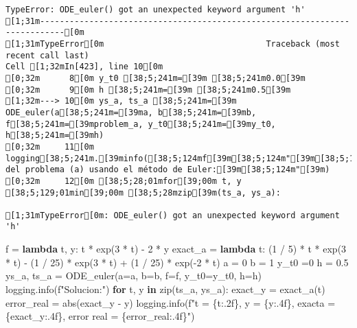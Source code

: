 \documentclass[
  letterpaper,
  DIV=11,
  numbers=noendperiod]{scrartcl}
\newenvironment{Shaded}{\begin{snugshade}}{\end{snugshade}}
\newcommand{\BuiltInTok}[1]{\textcolor[rgb]{0.00,0.23,0.31}{#1}}
\newcommand{\ControlFlowTok}[1]{\textcolor[rgb]{0.00,0.23,0.31}{\textbf{#1}}}
\newcommand{\DecValTok}[1]{\textcolor[rgb]{0.68,0.00,0.00}{#1}}
\newcommand{\FloatTok}[1]{\textcolor[rgb]{0.68,0.00,0.00}{#1}}
\newcommand{\KeywordTok}[1]{\textcolor[rgb]{0.00,0.23,0.31}{\textbf{#1}}}
\newcommand{\NormalTok}[1]{\textcolor[rgb]{0.00,0.23,0.31}{#1}}
\newcommand{\OperatorTok}[1]{\textcolor[rgb]{0.37,0.37,0.37}{#1}}
\newcommand{\SpecialCharTok}[1]{\textcolor[rgb]{0.37,0.37,0.37}{#1}}
\newcommand{\SpecialStringTok}[1]{\textcolor[rgb]{0.13,0.47,0.30}{#1}}
\begin{document}
\begin{verbatim}
TypeError: ODE_euler() got an unexpected keyword argument 'h'
[1;31m---------------------------------------------------------------------------[0m
[1;31mTypeError[0m                                 Traceback (most recent call last)
Cell [1;32mIn[423], line 10[0m
[0;32m      8[0m y_t0 [38;5;241m=[39m [38;5;241m0.0[39m
[0;32m      9[0m h [38;5;241m=[39m [38;5;241m0.5[39m
[1;32m---> 10[0m ys_a, ts_a [38;5;241m=[39m ODE_euler(a[38;5;241m=[39ma, b[38;5;241m=[39mb, f[38;5;241m=[39mproblem_a, y_t0[38;5;241m=[39my_t0, h[38;5;241m=[39mh)
[0;32m     11[0m logging[38;5;241m.[39minfo([38;5;124mf[39m[38;5;124m"[39m[38;5;124mResultados del problema (a) usando el método de Euler:[39m[38;5;124m"[39m)
[0;32m     12[0m [38;5;28;01mfor[39;00m t, y [38;5;129;01min[39;00m [38;5;28mzip[39m(ts_a, ys_a):

[1;31mTypeError[0m: ODE_euler() got an unexpected keyword argument 'h'
\end{verbatim}

\begin{Shaded}
\begin{Highlighting}[]
\NormalTok{f }\OperatorTok{=} \KeywordTok{lambda}\NormalTok{ t, y: t }\OperatorTok{*}\NormalTok{ exp(}\DecValTok{3} \OperatorTok{*}\NormalTok{ t) }\OperatorTok{{-}} \DecValTok{2} \OperatorTok{*}\NormalTok{ y}
\NormalTok{exact\_a }\OperatorTok{=} \KeywordTok{lambda}\NormalTok{ t: (}\DecValTok{1} \OperatorTok{/} \DecValTok{5}\NormalTok{) }\OperatorTok{*}\NormalTok{ t }\OperatorTok{*}\NormalTok{ exp(}\DecValTok{3} \OperatorTok{*}\NormalTok{ t) }\OperatorTok{{-}}\NormalTok{ (}\DecValTok{1} \OperatorTok{/} \DecValTok{25}\NormalTok{) }\OperatorTok{*}\NormalTok{ exp(}\DecValTok{3} \OperatorTok{*}\NormalTok{ t) }\OperatorTok{+}\NormalTok{ (}\DecValTok{1} \OperatorTok{/} \DecValTok{25}\NormalTok{) }\OperatorTok{*}\NormalTok{ exp(}\OperatorTok{{-}}\DecValTok{2} \OperatorTok{*}\NormalTok{ t)}
\NormalTok{a }\OperatorTok{=} \DecValTok{0}
\NormalTok{b }\OperatorTok{=} \DecValTok{1}
\NormalTok{y\_t0 }\OperatorTok{=}\DecValTok{0}
\NormalTok{h }\OperatorTok{=} \FloatTok{0.5}
\NormalTok{ys\_a, ts\_a }\OperatorTok{=}\NormalTok{ ODE\_euler(a}\OperatorTok{=}\NormalTok{a, b}\OperatorTok{=}\NormalTok{b, f}\OperatorTok{=}\NormalTok{f, y\_t0}\OperatorTok{=}\NormalTok{y\_t0, h}\OperatorTok{=}\NormalTok{h)}
\NormalTok{logging.info(}\SpecialStringTok{f"Solucion:"}\NormalTok{)}
\ControlFlowTok{for}\NormalTok{ t, y }\KeywordTok{in} \BuiltInTok{zip}\NormalTok{(ts\_a, ys\_a):}
\NormalTok{    exact\_y }\OperatorTok{=}\NormalTok{ exact\_a(t)}
\NormalTok{    error\_real }\OperatorTok{=} \BuiltInTok{abs}\NormalTok{(exact\_y }\OperatorTok{{-}}\NormalTok{ y)}
\NormalTok{    logging.info(}\SpecialStringTok{f"t = }\SpecialCharTok{\{}\NormalTok{t}\SpecialCharTok{:.2f\}}\SpecialStringTok{, y = }\SpecialCharTok{\{}\NormalTok{y}\SpecialCharTok{:.4f\}}\SpecialStringTok{, exacta = }\SpecialCharTok{\{}\NormalTok{exact\_y}\SpecialCharTok{:.4f\}}\SpecialStringTok{, error real = }\SpecialCharTok{\{}\NormalTok{error\_real}\SpecialCharTok{:.4f\}}\SpecialStringTok{"}\NormalTok{)}
\end{Highlighting}
\end{Shaded}
\end{document}
